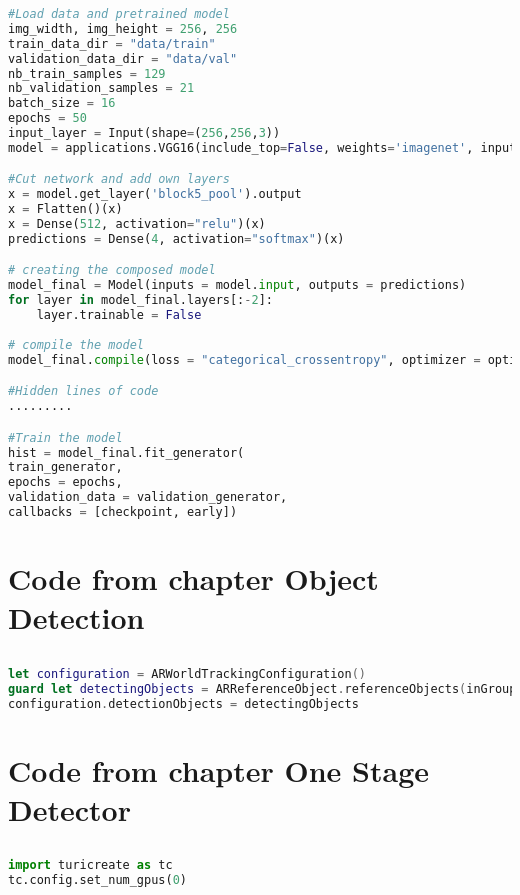 \begin{appendices}
\begin{lstlisting}[language=python]
#Load data and pretrained model
img_width, img_height = 256, 256
train_data_dir = "data/train"
validation_data_dir = "data/val"
nb_train_samples = 129
nb_validation_samples = 21
batch_size = 16
epochs = 50
input_layer = Input(shape=(256,256,3))
model = applications.VGG16(include_top=False, weights='imagenet', input_tensor=input_layer, pooling=None)

#Cut network and add own layers
x = model.get_layer('block5_pool').output
x = Flatten()(x)
x = Dense(512, activation="relu")(x)
predictions = Dense(4, activation="softmax")(x)

# creating the composed model
model_final = Model(inputs = model.input, outputs = predictions)
for layer in model_final.layers[:-2]:
    layer.trainable = False
    
# compile the model
model_final.compile(loss = "categorical_crossentropy", optimizer = optimizers.SGD(lr = 0.0001, momentum = 0.9), metrics=["accuracy"])

#Hidden lines of code
.........

#Train the model
hist = model_final.fit_generator(
train_generator,
epochs = epochs,
validation_data = validation_generator,
callbacks = [checkpoint, early])
\end{lstlisting}

\chapter{Code from chapter Object Detection}
\section{}

\begin{lstlisting}[language=swift]
let configuration = ARWorldTrackingConfiguration()
guard let detectingObjects = ARReferenceObject.referenceObjects(inGroupNamed: "Objects", bundle: nil) else { return }
configuration.detectionObjects = detectingObjects
\end{lstlisting}

\chapter{Code from  chapter One Stage Detector}
\section{}
\begin{lstlisting}[language=python]
import turicreate as tc
tc.config.set_num_gpus(0)


\end{lstlisting}
\end{appendices}
